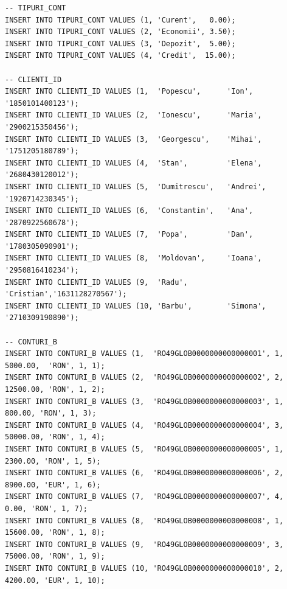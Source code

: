 \documentclass[12pt,a4paper]{article}
\begin{document}
\begin{lstlisting}
-- TIPURI_CONT
INSERT INTO TIPURI_CONT VALUES (1, 'Curent',   0.00);
INSERT INTO TIPURI_CONT VALUES (2, 'Economii', 3.50);
INSERT INTO TIPURI_CONT VALUES (3, 'Depozit',  5.00);
INSERT INTO TIPURI_CONT VALUES (4, 'Credit',  15.00);

-- CLIENTI_ID
INSERT INTO CLIENTI_ID VALUES (1,  'Popescu',      'Ion',     '1850101400123');
INSERT INTO CLIENTI_ID VALUES (2,  'Ionescu',      'Maria',   '2900215350456');
INSERT INTO CLIENTI_ID VALUES (3,  'Georgescu',    'Mihai',   '1751205180789');
INSERT INTO CLIENTI_ID VALUES (4,  'Stan',         'Elena',   '2680430120012');
INSERT INTO CLIENTI_ID VALUES (5,  'Dumitrescu',   'Andrei',  '1920714230345');
INSERT INTO CLIENTI_ID VALUES (6,  'Constantin',   'Ana',     '2870922560678');
INSERT INTO CLIENTI_ID VALUES (7,  'Popa',         'Dan',     '1780305090901');
INSERT INTO CLIENTI_ID VALUES (8,  'Moldovan',     'Ioana',   '2950816410234');
INSERT INTO CLIENTI_ID VALUES (9,  'Radu',         'Cristian','1631128270567');
INSERT INTO CLIENTI_ID VALUES (10, 'Barbu',        'Simona',  '2710309190890');

-- CONTURI_B
INSERT INTO CONTURI_B VALUES (1,  'RO49GLOB0000000000000001', 1, 5000.00,  'RON', 1, 1);
INSERT INTO CONTURI_B VALUES (2,  'RO49GLOB0000000000000002', 2, 12500.00, 'RON', 1, 2);
INSERT INTO CONTURI_B VALUES (3,  'RO49GLOB0000000000000003', 1,   800.00, 'RON', 1, 3);
INSERT INTO CONTURI_B VALUES (4,  'RO49GLOB0000000000000004', 3, 50000.00, 'RON', 1, 4);
INSERT INTO CONTURI_B VALUES (5,  'RO49GLOB0000000000000005', 1,  2300.00, 'RON', 1, 5);
INSERT INTO CONTURI_B VALUES (6,  'RO49GLOB0000000000000006', 2,  8900.00, 'EUR', 1, 6);
INSERT INTO CONTURI_B VALUES (7,  'RO49GLOB0000000000000007', 4,     0.00, 'RON', 1, 7);
INSERT INTO CONTURI_B VALUES (8,  'RO49GLOB0000000000000008', 1, 15600.00, 'RON', 1, 8);
INSERT INTO CONTURI_B VALUES (9,  'RO49GLOB0000000000000009', 3, 75000.00, 'RON', 1, 9);
INSERT INTO CONTURI_B VALUES (10, 'RO49GLOB0000000000000010', 2,  4200.00, 'EUR', 1, 10);


\end{lstlisting}
\end{document}
